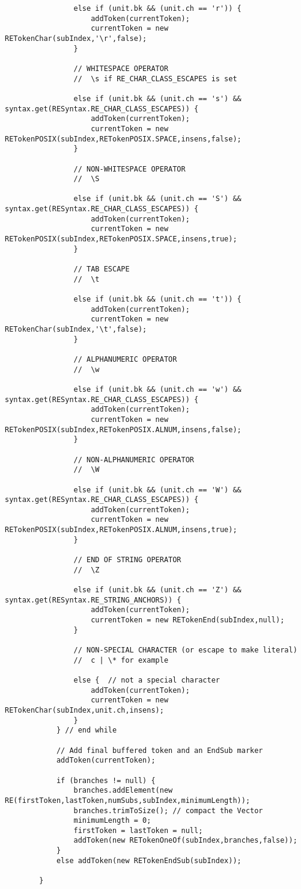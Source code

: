 \begin{mdframed}
\begin{lstlisting}
				else if (unit.bk && (unit.ch == 'r')) {
					addToken(currentToken);
					currentToken = new RETokenChar(subIndex,'\r',false);
				}
				
				// WHITESPACE OPERATOR
				//  \s if RE_CHAR_CLASS_ESCAPES is set
				
				else if (unit.bk && (unit.ch == 's') && syntax.get(RESyntax.RE_CHAR_CLASS_ESCAPES)) {
					addToken(currentToken);
					currentToken = new RETokenPOSIX(subIndex,RETokenPOSIX.SPACE,insens,false);
				}
				
				// NON-WHITESPACE OPERATOR
				//  \S
				
				else if (unit.bk && (unit.ch == 'S') && syntax.get(RESyntax.RE_CHAR_CLASS_ESCAPES)) {
					addToken(currentToken);
					currentToken = new RETokenPOSIX(subIndex,RETokenPOSIX.SPACE,insens,true);
				}
				
				// TAB ESCAPE
				//  \t
				
				else if (unit.bk && (unit.ch == 't')) {
					addToken(currentToken);
					currentToken = new RETokenChar(subIndex,'\t',false);
				}
				
				// ALPHANUMERIC OPERATOR
				//  \w
				
				else if (unit.bk && (unit.ch == 'w') && syntax.get(RESyntax.RE_CHAR_CLASS_ESCAPES)) {
					addToken(currentToken);
					currentToken = new RETokenPOSIX(subIndex,RETokenPOSIX.ALNUM,insens,false);
				}
				
				// NON-ALPHANUMERIC OPERATOR
				//  \W
				
				else if (unit.bk && (unit.ch == 'W') && syntax.get(RESyntax.RE_CHAR_CLASS_ESCAPES)) {
					addToken(currentToken);
					currentToken = new RETokenPOSIX(subIndex,RETokenPOSIX.ALNUM,insens,true);
				}
				
				// END OF STRING OPERATOR
				//  \Z
				
				else if (unit.bk && (unit.ch == 'Z') && syntax.get(RESyntax.RE_STRING_ANCHORS)) {
					addToken(currentToken);
					currentToken = new RETokenEnd(subIndex,null);
				}
				
				// NON-SPECIAL CHARACTER (or escape to make literal)
				//  c | \* for example
				
				else {  // not a special character
					addToken(currentToken);
					currentToken = new RETokenChar(subIndex,unit.ch,insens);
				} 
			} // end while
			
			// Add final buffered token and an EndSub marker
			addToken(currentToken);
			
			if (branches != null) {
				branches.addElement(new RE(firstToken,lastToken,numSubs,subIndex,minimumLength));
				branches.trimToSize(); // compact the Vector
				minimumLength = 0;
				firstToken = lastToken = null;
				addToken(new RETokenOneOf(subIndex,branches,false));
			} 
			else addToken(new RETokenEndSub(subIndex));
			
		}
\end{lstlisting}
\end{mdframed}
